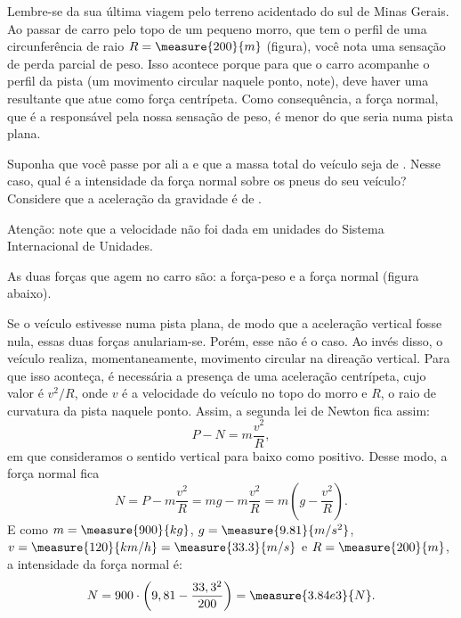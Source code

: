 \begin{question}
	Lembre-se da sua última viagem pelo terreno acidentado do sul de Minas Gerais.
	Ao passar de carro pelo topo de um pequeno morro, que tem o perfil de uma circunferência de raio $R = \measure{200}{m}$ (figura), você nota uma sensação de perda parcial de peso.
	Isso acontece porque para que o carro acompanhe o perfil da pista (um movimento circular naquele ponto, note), deve haver uma resultante que atue como força centrípeta.
	Como consequência, a força normal, que é a responsável pela nossa sensação de peso, é menor do que seria numa pista plana.
	
	Suponha que você passe por ali a  e que a massa total do veículo seja de .
	Nesse caso, qual é a intensidade da força normal sobre os pneus do seu veículo?
	Considere que a aceleração da gravidade é de .


	\begin{compactdesc}
		\item[Atenção:] note que a velocidade não foi dada em unidades do Sistema Internacional de Unidades.
	\end{compactdesc}

	\begin{answer}
	\end{answer}

	\begin{solution}
		As duas forças que agem no carro são: a força-peso e a força normal (figura abaixo).


		Se o veículo estivesse numa pista plana, de modo que a aceleração vertical fosse nula, essas duas forças anulariam-se.
		Porém, esse não é o caso.
		Ao invés disso, o veículo realiza, momentaneamente, movimento circular na direação vertical.
		Para que isso aconteça, é necessária a presença de uma aceleração centrípeta, cujo valor é $v^2/R$, onde $v$ é a velocidade do veículo no topo do morro e $R$, o raio de curvatura da pista naquele ponto.
		Assim, a segunda lei de Newton fica assim:
		\begin{equation*}
			P - N = m\frac{v^2}{R},
		\end{equation*}
		em que consideramos o sentido vertical para baixo como positivo.
		Desse modo, a força normal fica
		\begin{equation*}
			N = P - m\frac{v^2}{R}
			  = mg - m\frac{v^2}{R}
			  = m\left(g - \frac{v^2}{R}\right).
		\end{equation*}
		E como $m = \measure{900}{kg}$, $g = \measure{9.81}{m/s^2}$, $v = \measure{120}{km/h} = \measure{33.3}{m/s}$ e $R = \measure{200}{m}$, a intensidade da força normal é:
		\begin{equation*}
			N = 900 \cdot \left(9,81 - \frac{33,3^2}{200}\right) = \measure{3.84e3}{N}.
		\end{equation*}


\end{solution}
\end{question}
